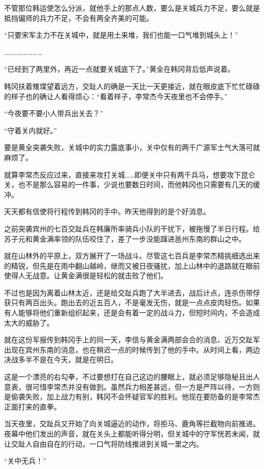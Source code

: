 不管那位韩运使怎么分派，就他手上的那点人数，要么是关城兵力不足，要么就是抵挡偏师的兵力不足，不会有两全齐美的可能。

“只要宋军主力不在关城中，就是用土来堆，我们也能一口气堆到城头上！”

……………………

“已经到了两里外，再近一点就要关城底下了。”黄全在韩冈背后低声说着。

韩冈扶着雉堞望着远方，交趾人的确是一天比一天更接近，就在眼皮底下忙忙碌碌的样子也的确让人看得烦心：“看着样子，李常杰今天夜里也不会停手。”

“今夜要不要小人带兵出关去？”

“守着关内就好。”

要是黄全突袭失败，关城中的实力露底事小，关中仅有的两千广源军士气大落可就麻烦了。

就算李常杰反应过来，直接来攻打关城……即便关中只有两千兵马，想要攻下昆仑关，也不是那么容易的一件事，少说也要数日时间，而他韩冈也只需要有几天的缓冲。

天天都有信使将行程传到韩冈的手中。昨天他得到的是个好消息。

之前突袭宾州的七百交趾兵在韩廉所率骑兵小队的干扰下，被拖慢了半日行程。给苏子元和黄金满率领的队伍咬住了，差了一步没能蹿进邕州东南的群山之中。

就在山林外的平原上，双方展开了一场战斗。尽管这七百兵是李常杰精挑细选出来的精锐，但先是在雨中翻山越岭，继而又被日夜骚扰，加上山林中的退路就在眼前使得人无战意。让黄金满很是轻松的就击败了他们。

不过也是因为离着山林太近，还是给交趾兵跑了大半进去，战后计点，连杀伤带俘获只有两百出头。跑出去的近五百人，不是毫发无伤，就是一点点皮肉轻伤。如果有人能够将他们重新组织起来，还是会有着一定的战斗力，但短时间内，不会造成太大的威胁了。

就在这份军报传到韩冈手上的同一天，李信与黄金满两部会合的消息、近万交趾军出现在宾州东南的消息，也在稍迟一点的时候传到了他的手中。从时间上看，两边决战多半不是在今天，就是在明日。

这是一个漂亮的右勾拳，不过要想打在自己这边的腰眼上，就必须足够隐秘且出人意表，很可惜李常杰并没有做到。虽然兵力相差甚远，但一方是严阵以待，一方则是偷袭失败，加上战力有别，韩冈不会怀疑官军的胜利。他现在要防备的是李常杰正面打来的直拳。

当天夜里，交趾兵又开始了向关城逼近的动作，将拒马、鹿角等拦截物向前推进。夜幕中他们发出的声音，就在关头上都能听得分明，但关城中的守军恍若未闻，就让交趾人自由自在的行动，一口气将防线推进到关城一里之内。

“关中无兵！”

